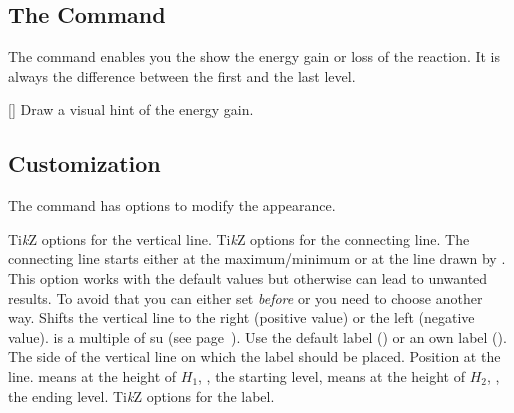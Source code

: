 \documentclass[load-preamble+]{cnltx-doc}
\newcommand*\TikZ{Ti\textit{k}Z}
\begin{document}
\subsection{The  Command}

The command  enables you the show the energy gain or loss of the
reaction.  It is always the difference between the first and the last level.
\begin{commands}
  []
    Draw a visual hint of the energy gain.
\end{commands}

\begin{example}
  \begin{endiagram}
    \ShowGain
  \end{endiagram}
\end{example}

\subsection{Customization}

The command has options to modify the appearance.
\begin{options}
  \Default{<->}
    \TikZ{} options for the vertical line.
    \TikZ{} options for the connecting line.
    The connecting line starts either at the maximum/minimum or at the line
    drawn by .  This option works with the default values but
    otherwise can lead to unwanted results.  To avoid that you can either set
     \emph{before}  or you need to choose another
    way.
    Shifts the vertical line to the right (positive value) or the left
    (negative value).   is a multiple of \ac{su} (see
    page~\pageref{key:unit}).
    Use the default label () or an own label
    ().\label{key:showgain_label}
    The side of the vertical line on which the label should be placed.
    Position at the line.  means at the height of $H_1$, \ie, the
    starting level,  means at the height of $H_2$, \ie, the ending
    level.
  \Default
    \TikZ{} options for the label.
\end{options}
\end{document}
